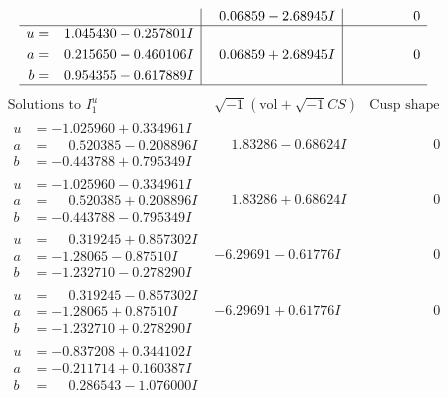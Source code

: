 \documentclass[1p]{elsarticle_modified}
\theoremstyle{definition}
\newcommand{\I}{\sqrt{-1}}
\begin{document}
$$\begin{array}{c|c|c}
 & \phantom{-}0.06859 - 2.68945 I & \phantom{-0.000000 } 0 \\ \hline\begin{aligned}
u &= \phantom{-}1.045430 - 0.257801 I \\
a &= \phantom{-}0.215650 - 0.460106 I \\
b &= \phantom{-}0.954355 - 0.617889 I\end{aligned}
 & \phantom{-}0.06859 + 2.68945 I & \phantom{-0.000000 } 0\\
 \hline 
 \end{array}$$\newpage$$\begin{array}{c|c|c}  
\text{Solutions to }I^u_{1}& \I (\text{vol} + \sqrt{-1}CS) & \text{Cusp shape}\\
 \hline 
\begin{aligned}
u &= -1.025960 + 0.334961 I \\
a &= \phantom{-}0.520385 - 0.208896 I \\
b &= -0.443788 + 0.795349 I\end{aligned}
 & \phantom{-}1.83286 - 0.68624 I & \phantom{-0.000000 } 0 \\ \hline\begin{aligned}
u &= -1.025960 - 0.334961 I \\
a &= \phantom{-}0.520385 + 0.208896 I \\
b &= -0.443788 - 0.795349 I\end{aligned}
 & \phantom{-}1.83286 + 0.68624 I & \phantom{-0.000000 } 0 \\ \hline\begin{aligned}
u &= \phantom{-}0.319245 + 0.857302 I \\
a &= -1.28065 - 0.87510 I \\
b &= -1.232710 - 0.278290 I\end{aligned}
 & -6.29691 - 0.61776 I & \phantom{-0.000000 } 0 \\ \hline\begin{aligned}
u &= \phantom{-}0.319245 - 0.857302 I \\
a &= -1.28065 + 0.87510 I \\
b &= -1.232710 + 0.278290 I\end{aligned}
 & -6.29691 + 0.61776 I & \phantom{-0.000000 } 0 \\ \hline\begin{aligned}
u &= -0.837208 + 0.344102 I \\
a &= -0.211714 + 0.160387 I \\
b &= \phantom{-}0.286543 - 1.076000 I\end{aligned}

\end{array}$$
\end{document}
